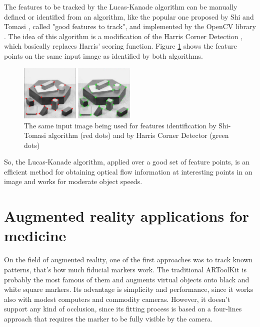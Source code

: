 \documentclass[msc, a4paper, classic, en]{ufbathesis}
\begin{document}
The features to be tracked by the Lucas-Kanade algorithm can be manually defined or identified from an algorithm, like the popular one proposed by Shi and Tomasi \cite{shi}, called "good features to track", and implemented by the OpenCV library \cite{opencv}. The idea of this algorithm is a modification of the Harris Corner Detection \cite{harris}, which basically replaces Harris' scoring function. Figure \ref{fig:shi-harris} shows the feature points on the same input image as identified by both algorithms.

\begin{figure}
\label{fig:shi-harris}
\centering
\includegraphics[width=0.5\textwidth]{images/shi-harris.png}
\caption{The same input image being used for features identification by Shi-Tomasi algorithm (red dots) and by Harris Corner Detector (green dots)}
\end{figure}

So, the Lucas-Kanade algorithm, applied over a good set of feature points, is an efficient method for obtaining optical flow information at interesting points in an image and works for moderate object speeds.


\section{Augmented reality applications for medicine}

On the field of augmented reality, one of the first approaches was to track known patterns, that's how much fiducial markers work. The traditional ARToolKit \cite{artoolkit} is probably the most famous of them and augments virtual objects onto black and white square markers. Its advantage is simplicity and performance, since it works also with modest computers and commodity cameras. However, it doesn't support any kind of occlusion, since its fitting process is based on a four-lines approach that requires the marker to be fully visible by the camera.
\end{document}

